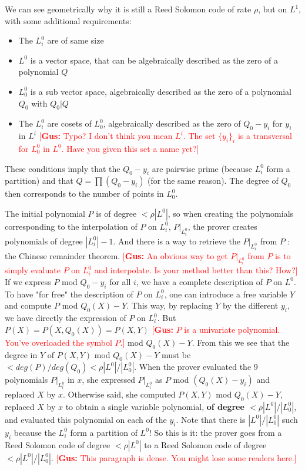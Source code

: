 \documentclass[12pt]{extarticle}
\newcommand{\<}{\langle}
\renewcommand{\>}{\rangle}
\theoremstyle{definition}
\newcommand{\gus}[1]{\textcolor{red}{[\textbf{Gus:} #1]}}
\begin{document}
We can see geometrically why it is still a Reed Solomon code of rate $\rho$, but on $L^1$, with some additional requirements:
\begin{itemize}
    \item The $L^0_i$ are of same size
    \item $L^0$ is a vector space, that can be algebraically described as the zero of a polynomial $Q$
    \item $L^0_0$ is a sub vector space, algebraically described as the zero of a polynomial $Q_0$ with $Q_0|Q$
    \item The $L^0_i$ are cosets of $L^0_0$, algebraically described as the zero of $Q_0-y_i$ for $y_i$ in $L^i$ \gus{Typo?  I don't think you mean $L^i$.  The set $\{y_i\}_i$ is a transversal for $L^0_0$ in $L^0$.  Have you given this set a name yet?}
\end{itemize}
These conditions imply that the $Q_0-y_i$ are pairwise prime (because $L^0_i$ form a partition) and that $Q=\prod (Q_0-y_i)$ (for the same reason). The degree of $Q_0$ then corresponds to the number of points in $L^0_0$.

The initial polynomial $P$ is of degree $<\rho|L^0|$, so when creating the polynomials corresponding to the interpolation of $P$ on $L^0_i$, $P|_{L^0_i}$, the prover creates polynomials of degree $|L^0_i|-1$. And there is a way to retrieve the $P|_{L^0_i}$ from $P$ : the Chinese remainder theorem.
\gus{An obvious way to get $P|_{L^0_i}$ from $P$ is to simply evaluate $P$ on $L^0_i$ and interpolate.  Is your method better than this?  How?}
If we express $P$ mod $Q_0-y_i$ for all $i$, we have a complete description of $P$ on $L^0$. To have "for free" the description of $P$ on $L^0_i$, one can introduce a free variable $Y$ and compute $P$ mod $Q_0(X)-Y$. This way, by replacing  $Y$ by the different $y_i$, we have directly the expression of $P$ on $L^0_i$. But $P(X)=P(X,Q_0(X))=P(X,Y)$ \gus{$P$ is a univariate polynomial.  You've overloaded the symbol $P$.} mod $Q_0(X)-Y$. From this we see that the degree in $Y$ of $P(X,Y)$ mod $Q_0(X)-Y$ must be $<deg(P)/deg(Q_0)<\rho |L^0|/|L^0_0|$. When the prover evaluated the $9$ polynomials $P|_{L^0_i}$ in $x$, she expressed $P|_{L^0_i}$ as $P$ mod $(Q_0(X)-y_i)$ and replaced $X$ by $x$. Otherwise said, she computed $P(X,Y)$ mod $Q_0(X)-Y$, replaced $X$ by $x$ to obtain a single variable polynomial, \textbf{of degree $<\rho|L^0|/|L^0_0|$}, and evaluated this polynomial on each of the $y_i$. Note that there is $|L^0|/|L^0_0|$ such $y_i$ because the $L^0_i$ form a partition of $L^0$! So this is it: the prover goes from a Reed Solomon code of degree $<\rho|L^0|$ to a Reed Solomon code of degree $<\rho|L^0|/|L^0_0|$.
\gus{This paragraph is dense.  You might lose some readers here.}
\end{document}
